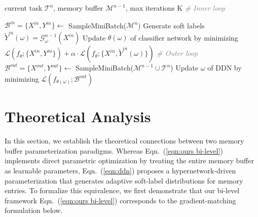\documentclass[table, xcdraw]{article}
\theoremstyle{plain}
\theoremstyle{definition}
\theoremstyle{remark}
\begin{document}
\begin{algorithm}[t]
   \caption{Training of DDN}
   \label{alg:slg}
\begin{algorithmic}
    current task $\mathcal{T}^n$, memory buffer $\mathcal{M}^{n-1}$, max iterations K
   \STATE \textit{\textcolor{gray}{\# Inner loop}}
  
   \STATE $\mathcal{B}^{in}\!=\!\{X^{in},Y^{in}\} \!\leftarrow\!$ SampleMiniBatch($\mathcal{M}^n$)
   \STATE Generate soft labels $\tilde{Y}^{in}(\omega)=\mathcal G_\omega^{n-1}(X^{in})$
   \STATE Update $\theta(\omega)$ of classifier network by minimizing  $\mathcal{L}(f_\theta;\{X^{in},Y^{in}\}) + \alpha \cdot \mathcal{L}(f_\theta;\{X^{in},\tilde{Y}^{in}(\omega)\})$ 
   \STATE \textit{\textcolor{gray}{\# Outer loop}}
   \STATE $\mathcal{B}^{out}\!=\!\{X^{out},Y^{out
   }\} \!\!\leftarrow\!\!$ SampleMiniBatch($\mathcal{M}^{n-1} \!\cup\! \mathcal{T}^n$)
   \STATE  Update $\omega$ of DDN by minimizing $\mathcal{L}(f_{\theta(\omega)};\mathcal{B}^{out})$ 
   \ENDFOR
\end{algorithmic}
\end{algorithm}


\section{Theoretical Analysis}
\label{sec:theorey}
In this section, we establish the theoretical connections between two memory buffer parameterization paradigms. Whereas Eqn.~(\ref{eqn:ours bi-level}) implements direct parametric optimization by treating the entire memory buffer as learnable parameters, Eqn.~(\ref{eqn:ddn}) proposes a hypernetwork-driven parameterization that generates adaptive soft-label distributions for memory entries. 
To formalize this equivalence, we first demonstrate that our bi-level framework Eqn.~(\ref{eqn:ours bi-level}) corresponds to the gradient-matching formulation below.  
\end{document}
